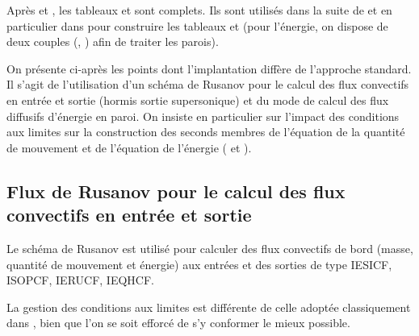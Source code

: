 Apr\`es  et , les tableaux  et 
sont complets. Ils sont utilis\'es dans la suite de  et en particulier
dans  pour construire les tableaux  et 
(pour l'\'energie, on dispose de deux couples (, ) afin de
traiter les parois).

On pr\'esente ci-apr\`es les points dont l'implantation diff\`ere
de l'approche standard. Il s'agit de
l'utilisation d'un sch\'ema de Rusanov pour le calcul des flux convectifs
en entr\'ee et sortie (hormis sortie supersonique)
et du mode de calcul des flux diffusifs d'\'energie en paroi.
On insiste en particulier sur l'impact des conditions aux limites
sur la construction des seconds membres de l'\'equation de la quantit\'e
de mouvement et de l'\'equation de l'\'energie ( et ).

\subsection*{Flux de Rusanov pour le calcul des flux convectifs en entr\'ee et sortie}

Le sch\'ema de Rusanov est utilis\'e pour calculer des flux convectifs de bord
(masse, quantit\'e de mouvement et \'energie) aux entr\'ees et des sorties
de type IESICF, ISOPCF, IERUCF, IEQHCF.

La gestion des conditions aux limites est diff\'erente de celle adopt\'ee
classiquement dans \CS, bien que l'on se soit efforc\'e de s'y conformer le
mieux possible.

